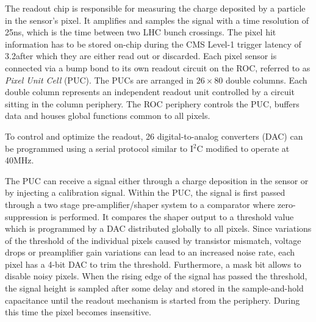 The readout chip is responsible for measuring the charge deposited by a particle in the sensor's pixel.
It amplifies and samples the signal with a time resolution of 25\unit{ns}, which is the time between two LHC bunch crossings.
The pixel hit information has to be stored on-chip during the CMS Level-1 trigger latency of 3.2\mus after which they are either read out or discarded.
Each pixel sensor is connected via a bump bond to its own readout circuit on the ROC, referred to as \textit{Pixel Unit Cell} (PUC). 
The PUCs are arranged in $26\times80$ double columns. Each double column represents an independent readout unit controlled by a circuit sitting in the column periphery.
The ROC periphery controls the PUC, buffers data and houses global functions common to all pixels.

To control and optimize the readout, 26 digital-to-analog converters (DAC) can be programmed using a serial protocol similar to I$^2$C modified to operate at 40\unit{MHz}.

The PUC can receive a signal either through a charge deposition in the sensor or by injecting a calibration signal.
Within the PUC, the signal is first passed through a two stage pre-amplifier/shaper system to a comparator where zero-suppression is performed.
It compares the shaper output to a threshold value which is programmed by a DAC distributed globally to all pixels.
Since variations of the threshold of the individual pixels caused by transistor mismatch, voltage drops or preamplifier gain variations can lead to an increased noise rate,
each pixel has a 4-bit DAC to trim the threshold. Furthermore, a mask bit allows to disable noisy pixels.
When the rising edge of the signal has passed the threshold, the signal height is sampled after some delay and stored in the sample-and-hold capacitance until the readout mechanism is started from the periphery. During this time the pixel becomes insensitive.


